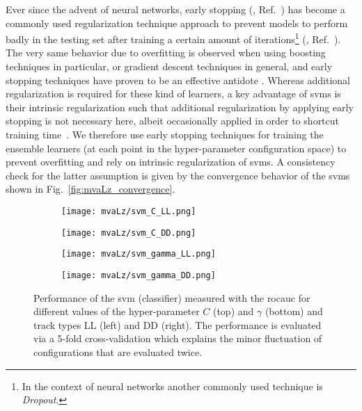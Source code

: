 Ever since the advent of neural networks, early stopping (\eg{}, Ref.~\cite{earlystopping_gd}) has become a commonly used regularization technique approach to prevent models to perform badly in the testing set after training a certain amount of iterations\footnote{In the context of neural networks another commonly used technique is \textit{Dropout}.} (\eg{}, Ref.~\cite{earlystopping_nn}).
The very same behavior due to overfitting is observed when using boosting techniques in particular, or gradient descent techniques in general, and early stopping techniques have proven to be an effective antidote \cite{earlystopping_boosting1,earlystopping_boosting2}.
Whereas additional regularization is required for these kind of learners, a key advantage of \glspl{svm} is their intrinsic regularization such that additional regularization by applying early stopping is not necessary here, albeit occasionally applied in order to shortcut training time~\cite{earlystopping_svm}.
We therefore use early stopping techniques for training the ensemble learners (at each point in the hyper-parameter configuration space) to prevent overfitting and rely on intrinsic regularization of \glspl{svm}.
A consistency check for the latter assumption is given by the convergence behavior of the \glspl{svm} shown in Fig.~\ref{fig:mvaLz_convergence}.

\begin{figure}[htbp]
    \centering
    \begin{subfigure}[b]{.49\textwidth}
        \centering
        \texttt{[image: mvaLz/svm\_C\_LL.png]}
    \end{subfigure}
    \begin{subfigure}[b]{.49\textwidth}
        \centering
        \texttt{[image: mvaLz/svm\_C\_DD.png]}
    \end{subfigure}
    \par\bigskip 
    \begin{subfigure}[b]{.49\textwidth}
        \centering
        \texttt{[image: mvaLz/svm\_gamma\_LL.png]}
    \end{subfigure}
    \begin{subfigure}[b]{.49\textwidth}
        \centering
        \texttt{[image: mvaLz/svm\_gamma\_DD.png]}
    \end{subfigure}
    \caption{Performance of the \gls{svm} (\Lz classifier) measured with the \gls{rocauc} for different values of the hyper-parameter $C$ (top) and $\gamma$ (bottom) and track types \gls{LL} (left) and \gls{DD} (right). The performance is evaluated via a 5-fold cross-validation which explains the minor fluctuation of configurations that are evaluated twice.}
    \label{fig:mvaLz_svm_hyperparams}
\end{figure}

